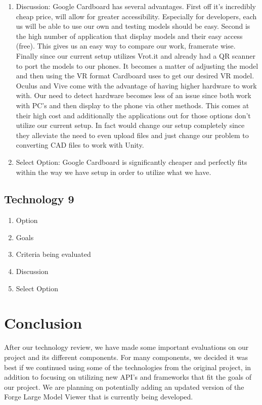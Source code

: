 \documentclass[letterpaper, 10pt, draftclsnofoot, compsoc, onecolumn]{IEEEtran}
\begin{document}
\begin{enumerate}
			\item{Discussion}: Google Cardboard has several advantages. First off it's incredibly cheap price, will allow for greater accessibility. Especially for developers, each us will be able to use our own and testing models should be easy. Second is the high number of application that display models and their easy access (free). This gives us an easy way to compare our work, framerate wise. Finally since our current setup utilizes Vrot.it and already had a QR scanner to port the models to our phones. It becomes a matter of adjusting the model and then using the VR format Cardboard uses to get our desired VR model. Oculus and Vive come with the advantage of having higher hardware to work with. Our need to detect hardware becomes less of an issue since both work with PC's and then display to the phone via other methods. This comes at their high cost and additionally the applications out for those options don't utilize our current setup. In fact would change our setup completely since they alleviate the need to even upload files and just change our problem to converting CAD files to work with Unity. 
			\item{Select Option}: Google Cardboard is significantly cheaper and perfectly fits within the way we have setup in order to utilize what we have. 
		\end{enumerate}
	\subsection{Technology 9}
		\begin{enumerate}
			\item{Option}
			\item{Goals}
			\item{Criteria being evaluated}
			\item{Discussion}
			\item{Select Option}
		\end{enumerate}


\section{Conclusion}
After our technology review, we have made some important evaluations on our project and its different components. For many components, we decided it was best if we continued using some of the technologies from the original project, in addition to focusing on utilizing new API's and frameworks that fit the goals of our project. We are planning on potentially adding an updated version of the Forge Large Model Viewer that is currently being developed.



\end{document}
